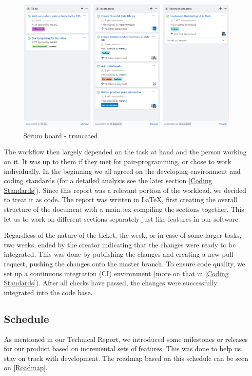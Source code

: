 \documentclass[main.tex]{subfiles}
\begin{document}
\begin{figure}[H]
   \centering
   \includegraphics[scale=0.55]{05Coding/05Pictures/scrumboard.png}
   \caption{Scrum board - truncated}
   \label{Scrum}
\end{figure}

The workflow then largely depended on the task at hand and the person working on it. It was up to them if they met for pair-programming, or chose to work individually. In the beginning we all agreed on the developing environment and coding standards (for a detailed analysis see the later section \ref{Coding Standards}). Since this report was a relevant portion of the workload, we decided to treat it as code. The report was written in \LaTeX, first creating the overall structure of the document with a main.tex compiling the sections together. This let us to work on different sections separately just like features in our software. 

Regardless of the nature of the ticket, the week, or in case of some larger tasks, two weeks, ended by the creator indicating that the changes were ready to be integrated. This was done by publishing the changes and creating a new pull request, pushing the changes onto the master branch. To ensure code quality, we set up a continuous integration (CI) environment (more on that in \ref{Coding Standards}). After all checks have passed, the changes were successfully integrated into the code base.

\subsection{Schedule}
As mentioned in our Technical Report, we introduced some milestones or releases for our product based on incremental sets of features. This was done to help us stay on track with development. The roadmap based on this schedule can be seen on \figurename{\ref{Roadmap}}.
\end{document}
